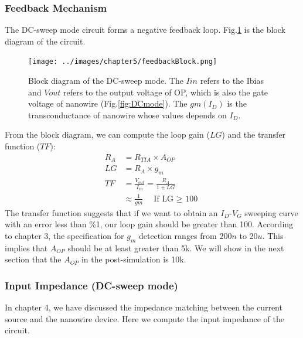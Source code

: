 {\subsubsection{Feedback Mechanism} \label{sec:feedM}
The DC-sweep mode circuit forms a negative feedback loop.
Fig.\ref{fig:feedblock} is the block diagram of the circuit.
\begin{figure}[tbp]
    \centering
        \texttt{[image: ../images/chapter5/feedbackBlock.png]}
    \caption{Block diagram of the DC-sweep mode. The $Iin$ refers to the Ibias and $Vout$ refers to the output voltage of OP, which is also the gate voltage of nanowire (Fig.\ref{fig:DCmode}). The $gm(I_D)$ is the transconductance of nanowire whose values depends on $I_D$.}
    \label{fig:feedblock}
\end{figure}

From the block diagram, we can compute the loop gain ($LG$) and the transfer function ($TF$):
\begin{align}
    R_A &= R_{TIA} \times A_{OP} \label{eq:TF_RA}\\
    LG &=  R_A \times g_m \label{eq:TF_LG}\\
    TF &= \frac{V_{out}}{I_{in}} =  \frac{R_A}{1 + LG} \label{eq:TF}\\
    &\approx \frac{1}{gm} \quad \text{If LG $\geq$ 100} \label{eq:TF_gm}
\end{align}
The transfer function suggests that if we want to obtain an $I_D$-$V_G$ sweeping curve with an error less than \%1, our loop gain should be greater than 100.
According to chapter 3, the specification for $g_m$ detection ranges from $200n$ to $20u$.
This implies that $A_{OP}$ should be at least greater than 5k.
We will show in the next section that the $A_{OP}$ in the post-simulation is 10k.

\subsubsection{Input Impedance (DC-sweep mode)}
In chapter 4, we have discussed the impedance matching between the current source and the nanowire device.
Here we compute the input impedance of the circuit.

}
